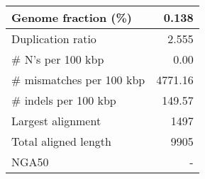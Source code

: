 \documentclass[12pt,a4paper]{article}
\begin{document}
\begin{table}[ht]
\begin{center}
\begin{tabular}{|l*{1}{|r}|}
Genome fraction (\%) & 0.138 \\ \hline
Duplication ratio & 2.555 \\ \hline
\# N's per 100 kbp & 0.00 \\ \hline
\# mismatches per 100 kbp & 4771.16 \\ \hline
\# indels per 100 kbp & 149.57 \\ \hline
Largest alignment & 1497 \\ \hline
Total aligned length & 9905 \\ \hline
NGA50 & - \\ \hline
\end{tabular}
\end{center}
\end{table}
\end{document}
